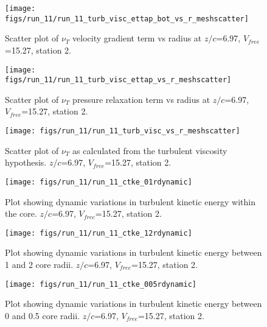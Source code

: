 \begin{figure}[H]
\centering
\texttt{[image: figs/run\_11/run\_11\_turb\_visc\_ettap\_bot\_vs\_r\_meshscatter]}
\caption{Scatter plot of $\nu_T$ velocity gradient term vs radius at $z/c$=6.97, $V_{free}$=15.27, station 2.}
\end{figure}


\begin{figure}[H]
\centering
\texttt{[image: figs/run\_11/run\_11\_turb\_visc\_ettap\_vs\_r\_meshscatter]}
\caption{Scatter plot of $\nu_T$ pressure relaxation term vs radius at $z/c$=6.97, $V_{free}$=15.27, station 2.}
\end{figure}


\begin{figure}[H]
\centering
\texttt{[image: figs/run\_11/run\_11\_turb\_visc\_vs\_r\_meshscatter]}
\caption{Scatter plot of $\nu_T$ as calculated from the turbulent viscosity hypothesis. $z/c$=6.97, $V_{free}$=15.27, station 2.}
\end{figure}


\begin{figure}[H]
\centering
\texttt{[image: figs/run\_11/run\_11\_ctke\_01rdynamic]}
\caption{Plot showing dynamic variations in turbulent kinetic energy within the core. $z/c$=6.97, $V_{free}$=15.27, station 2.}
\end{figure}


\begin{figure}[H]
\centering
\texttt{[image: figs/run\_11/run\_11\_ctke\_12rdynamic]}
\caption{Plot showing dynamic variations in turbulent kinetic energy between 1 and 2 core radii. $z/c$=6.97, $V_{free}$=15.27, station 2.}
\end{figure}


\begin{figure}[H]
\centering
\texttt{[image: figs/run\_11/run\_11\_ctke\_005rdynamic]}
\caption{Plot showing dynamic variations in turbulent kinetic energy between 0 and 0.5 core radii. $z/c$=6.97, $V_{free}$=15.27, station 2.}
\end{figure}


